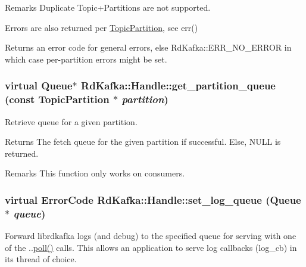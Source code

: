 \begin{DoxyRemark}{Remarks}
Duplicate Topic+Partitions are not supported. 

Errors are also returned per \hyperlink{classRdKafka_1_1TopicPartition}{TopicPartition}, see {\ttfamily err()} 
\end{DoxyRemark}
\begin{DoxyReturn}{Returns}
an error code for general errors, else RdKafka::ERR\_\-NO\_\-ERROR in which case per-\/partition errors might be set. 
\end{DoxyReturn}
\hypertarget{classRdKafka_1_1Handle_a23af70ef4129f215e5991a8065fe9efa}{
\subsubsection[{get\_\-partition\_\-queue}]{\setlength{\rightskip}{0pt plus 5cm}virtual {\bf Queue}$\ast$ RdKafka::Handle::get\_\-partition\_\-queue (const {\bf TopicPartition} $\ast$ {\em partition})}}
\label{classRdKafka_1_1Handle_a23af70ef4129f215e5991a8065fe9efa}


Retrieve queue for a given partition. \begin{DoxyReturn}{Returns}
The fetch queue for the given partition if successful. Else, NULL is returned.
\end{DoxyReturn}
\begin{DoxyRemark}{Remarks}
This function only works on consumers. 
\end{DoxyRemark}
\hypertarget{classRdKafka_1_1Handle_ac5b3511e38e4f9f8ae1eadbdd4e11d3d}{
\subsubsection[{set\_\-log\_\-queue}]{\setlength{\rightskip}{0pt plus 5cm}virtual ErrorCode RdKafka::Handle::set\_\-log\_\-queue ({\bf Queue} $\ast$ {\em queue})}}
\label{classRdKafka_1_1Handle_ac5b3511e38e4f9f8ae1eadbdd4e11d3d}


Forward librdkafka logs (and debug) to the specified queue for serving with one of the ..\hyperlink{classRdKafka_1_1Handle_a98d3b4ee48457ff13e4d5155e3fc5ea4}{poll()} calls. This allows an application to serve log callbacks ({\ttfamily log\_\-cb}) in its thread of choice.



